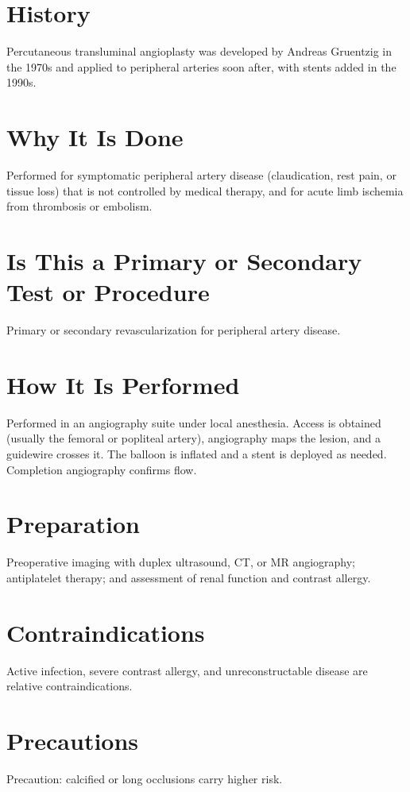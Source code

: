 \section*{History}
Percutaneous transluminal angioplasty was developed by Andreas Gruentzig in the 1970s and applied to peripheral arteries soon after, with stents added in the 1990s.

\section*{Why It Is Done}
Performed for symptomatic peripheral artery disease (claudication, rest pain, or tissue loss) that is not controlled by medical therapy, and for acute limb ischemia from thrombosis or embolism.

\section*{Is This a Primary or Secondary Test or Procedure}
Primary or secondary revascularization for peripheral artery disease.

\section*{How It Is Performed}
Performed in an angiography suite under local anesthesia. Access is obtained (usually the femoral or popliteal artery), angiography maps the lesion, and a guidewire crosses it. The balloon is inflated and a stent is deployed as needed. Completion angiography confirms flow.

\section*{Preparation}
Preoperative imaging with duplex ultrasound, CT, or MR angiography; antiplatelet therapy; and assessment of renal function and contrast allergy.

\section*{Contraindications}
Active infection, severe contrast allergy, and unreconstructable disease are relative contraindications.

\section*{Precautions}
Precaution: calcified or long occlusions carry higher risk.

